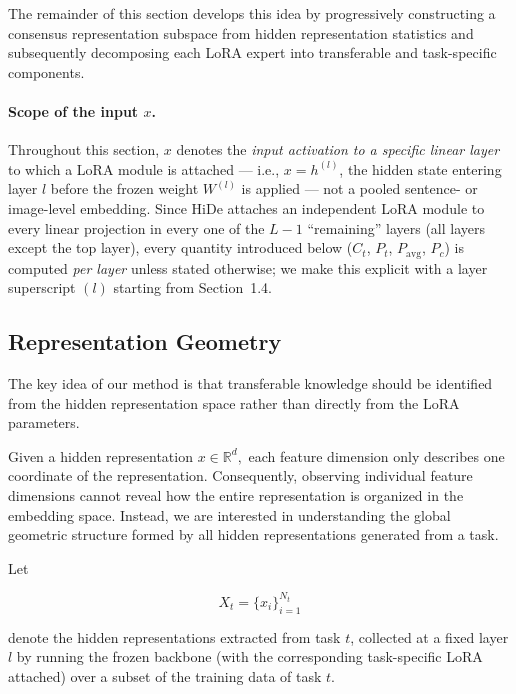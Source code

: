 \documentclass[a4paper]{article}
\begin{document}
The remainder of this section develops this idea by progressively constructing a consensus representation subspace from hidden representation statistics and subsequently decomposing each LoRA expert into transferable and task-specific components.

\paragraph{Scope of the input $x$.} Throughout this section, $x$ denotes the \emph{input activation to a specific linear layer} to which a LoRA module is attached — i.e., $x = h^{(l)}$, the hidden state entering layer $l$ before the frozen weight $W^{(l)}$ is applied — not a pooled sentence- or image-level embedding. Since HiDe attaches an independent LoRA module to every linear projection in every one of the $L{-}1$ ``remaining'' layers (all layers except the top layer), every quantity introduced below ($C_t$, $P_t$, $P_{\mathrm{avg}}$, $P_c$) is computed \emph{per layer} unless stated otherwise; we make this explicit with a layer superscript $(l)$ starting from Section~1.4.

\subsection{Representation Geometry}

The key idea of our method is that transferable knowledge should be identified from the hidden representation space rather than directly from the LoRA parameters.

Given a hidden representation
\(
x\in\mathbb{R}^{d},
\)
each feature dimension only describes one coordinate of the representation. Consequently, observing individual feature dimensions cannot reveal how the entire representation is organized in the embedding space. Instead, we are interested in understanding the global geometric structure formed by all hidden representations generated from a task.

Let

\begin{equation}
X_t=\{x_i\}_{i=1}^{N_t}
\end{equation}

denote the hidden representations extracted from task $t$, collected at a fixed layer $l$ by running the frozen backbone (with the corresponding task-specific LoRA attached) over a subset of the training data of task $t$.
\end{document}
